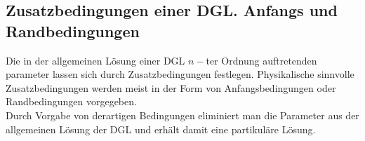 \begin{enumerate}
\begin{figure}[ht]
\begin{minipage}[b]{0.45\linewidth}
\begin{center}
\end{center}

\end{minipage}
\end{figure}
\end{enumerate}
\subsection*{Zusatzbedingungen einer DGL. Anfangs und Randbedingungen}
Die in der allgemeinen Lösung einer DGL $n-$ter Ordnung auftretenden parameter lassen sich durch Zusatzbedingungen festlegen. Physikalische sinnvolle Zusatzbedingungen werden meist in der Form von Anfangsbedingungen oder Randbedingungen vorgegeben. \\

Durch Vorgabe von derartigen Bedingungen eliminiert man die Parameter aus der allgemeinen Lösung der DGL und erhält damit eine partikuläre Lösung.
